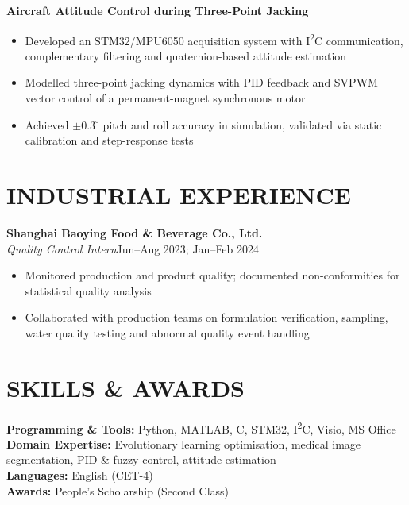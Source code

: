 \documentclass[10pt,a4paper]{article}
\begin{document}
\textbf{Aircraft Attitude Control during Three-Point Jacking}
\begin{itemize}
  \item Developed an STM32/MPU6050 acquisition system with I\textsuperscript{2}C communication, complementary filtering and quaternion-based attitude estimation
  \item Modelled three-point jacking dynamics with PID feedback and SVPWM vector control of a permanent-magnet synchronous motor
  \item Achieved $\pm 0.3^{\circ}$ pitch and roll accuracy in simulation, validated via static calibration and step-response tests
\end{itemize}

\section*{INDUSTRIAL EXPERIENCE}
\textbf{Shanghai Baoying Food \& Beverage Co., Ltd.}\\
\textit{Quality Control Intern}\hfill Jun--Aug 2023; Jan--Feb 2024
\begin{itemize}
  \item Monitored production and product quality; documented non-conformities for statistical quality analysis
  \item Collaborated with production teams on formulation verification, sampling, water quality testing and abnormal quality event handling
\end{itemize}

\section*{SKILLS \& AWARDS}
\textbf{Programming \& Tools:} Python, MATLAB, C, STM32, I\textsuperscript{2}C, Visio, MS Office\\
\textbf{Domain Expertise:} Evolutionary learning optimisation, medical image segmentation, PID \& fuzzy control, attitude estimation\\
\textbf{Languages:} English (CET-4)\\
\textbf{Awards:} People's Scholarship (Second Class)
\end{document}
